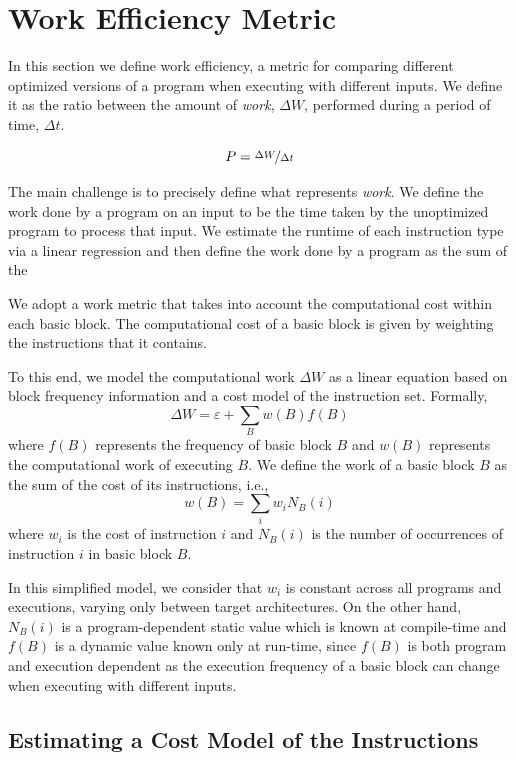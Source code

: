 \section{Work Efficiency Metric} \label{sec:metric}

In this section we define work efficiency, a metric for comparing different optimized versions of a program when executing with different
inputs. We define it as the ratio between the amount of \textit{work}, $\Delta W$, performed during a period of time, $\Delta t$.

\[
   P = \nicefrac{\Delta W}{\Delta t}
\]

The main challenge is to precisely define what represents \textit{work}.
We define the work done by a program on an input to be the time taken by the unoptimized program to process that input.
We estimate the runtime of each instruction type via a linear regression and then define the work done by a program as the sum of the

We adopt a work metric that takes into account the
computational cost within each basic block.
The computational cost of a basic block is given by weighting the instructions
that it contains.

To this end, we model the computational work $\Delta W$ as a linear equation based on block frequency information and a cost model of the instruction set.
Formally,
\[
\Delta W = \varepsilon + \sum_{B} w(B)f(B)
\]
where $f(B)$ represents the frequency of basic block $B$ and $w(B)$ represents the computational work of executing $B$.
We define the work of a basic block $B$ as the sum of the cost of its instructions, i.e.,
\[
w(B) = \sum_{i} w_i N_B(i)
\]
where $w_i$ is the cost of instruction $i$ and $N_B(i)$ is the number of occurrences of instruction $i$ in basic block $B$.

In this simplified model, we consider that $w_i$ is constant across all programs and executions, varying only between target architectures.
On the other hand, $N_B(i)$ is a program-dependent static value which is known at compile-time and $f(B)$ is a dynamic value known only at run-time,
since $f(B)$ is both program and execution dependent as the execution frequency of a basic block can change when executing with different inputs.

\subsection{Estimating a Cost Model of the Instructions}

